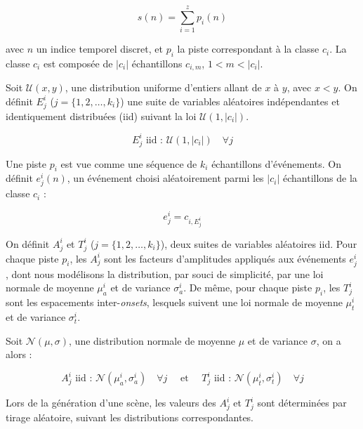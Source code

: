   \begin{equation}
  s(n)=\sum_{i=1}^{z}p_i(n)
  \end{equation}

  avec $n$ un indice temporel discret, et $p_i$ la piste correspondant à la classe $c_i$. La classe $c_i$ est composée de $\vert c_i\vert$ échantillons $c_{i,m}$, $1<m<\vert c_i\vert$.

  Soit $\mathcal{U}(x,y)$, une distribution uniforme d'entiers allant de $x$ à $y$, avec $x<y$. On définit $E_j^i$ ($j=\lbrace 1,2,\ldots,k_i\rbrace$) une suite de variables aléatoires indépendantes et identiquement distribuées (iid) suivant la loi $\mathcal{U}(1,\vert c_i \vert)$.

  \begin{equation}
  E_j^i \textrm{ iid : } \mathcal{U}(1,\vert c_i \vert) \quad \forall j
  \end{equation}

  Une piste $p_i$ est vue comme une séquence de $k_i$ échantillons d'événements. On définit $e_j^i(n)$, un événement choisi aléatoirement parmi les $\vert c_i\vert$ échantillons de la classe $c_i$ :

  \begin{equation}
  e_j^i=c_{i,E_j^i}
  \end{equation}

  On définit $A^i_j$ et $T^i_j$ ($j=\lbrace 1,2,\ldots,k_i\rbrace$), deux suites de variables aléatoires iid. Pour chaque piste $p_i$, les $A^i_j$ sont les facteurs d'amplitudes appliqués aux événements $e_j^i$, dont nous modélisons la distribution, par souci de simplicité, par une loi normale de moyenne $\mu_a^i$ et de variance $\sigma_a^i$. De même, pour chaque piste $p_i$, les $T_j^i$ sont les espacements inter-\emph{onsets}, lesquels suivent une loi normale de moyenne $\mu_t^i$ et de variance $\sigma_t^i$.

  Soit $\mathcal{N}(\mu,\sigma)$, une distribution normale de moyenne $\mu$ et de variance $\sigma$, on a alors :

  \begin{equation}
  \label{eq:ch4_eq1}
  A_j^i \textrm{ iid : } \mathcal{N}(\mu_a^{i},\sigma_a^{i}) \quad \forall j \quad \textrm{ et } \quad T_j^i \textrm{ iid : } \mathcal{N}({\mu_t^{i},\sigma_t^{i}}) \quad \forall j
  \end{equation}

  Lors de la génération d'une scène, les valeurs des $A^i_j$ et $T_j^i$ sont déterminées par tirage aléatoire, suivant les distributions correspondantes.

